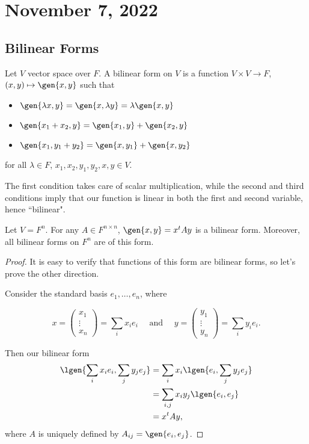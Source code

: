 \section{November 7, 2022}

\subsection{Bilinear Forms}

\begin{definition}

Let $V$ vector space over $F$. A \ac{bilinear form} on $V$ is a function $V\times V\rightarrow F$, $(x,y)\mapsto \gen{x,y}$ such that
\begin{itemize}
    \item $\gen{\lambda x,y} = \gen{x, \lambda y} = \lambda \gen{x,y}$
    \item $\gen{x_1 + x_2, y} = \gen{x_1,y} + \gen{x_2, y}$
    \item $\gen{x_1, y_1 + y_2} = \gen{x, y_1} + \gen{x, y_2}$
\end{itemize}
for all $\lambda\in F$, $x_1, x_2, y_1, y_2, x, y\in V$. 
\end{definition}

The first condition takes care of scalar multiplication, while the second and third conditions imply that our function is linear in both the first and second variable, hence ``bilinear".

\begin{theorem}
\proplabel

Let $V = F^n$. For any $A\in F^{n\times n}$, $\gen{x,y} = x^t Ay$ is a bilinear form. Moreover, all bilinear forms on $F^n$ are of this form. 
\end{theorem}

\begin{proof}
It is easy to verify that functions of this form are bilinear forms, so let's prove the other direction.

Consider the standard basis $e_1, \hdots, e_n$, where 

\[x = \begin{pmatrix}x_1\\ \vdots \\x_n
\end{pmatrix} = \sum_i x_ie_i \quad\text{ and }\quad y = \begin{pmatrix}y_1\\ \vdots \\y_n \end{pmatrix} = \sum_i y_ie_i.\] 

Then our bilinear form
\begin{align*}
    \lgen{\sum_i x_ie_i, \sum_j y_je_j} &= \sum_i x_i \lgen{e_i, \sum_j y_je_j} \\
    &= \sum_{i,j}x_iy_j \lgen{e_i, e_j} \\
    &= x^tAy,
\end{align*}
where $A$ is uniquely defined by $A_{ij} = \gen{e_i, e_j}$.

\end{proof}


